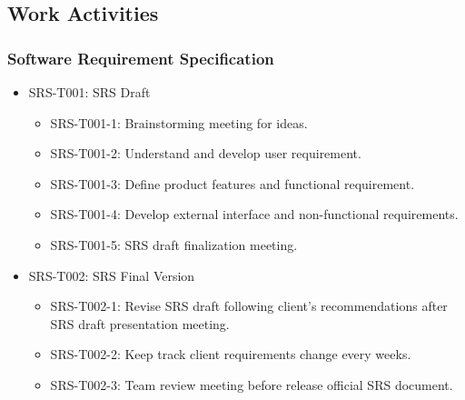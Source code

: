 \subsection{Work Activities}
	\subsubsection{Software Requirement Specification}
	\begin{itemize}
		\item SRS-T001: SRS Draft
		\begin{itemize}
			\item SRS-T001-1: Brainstorming meeting for ideas.
			\item SRS-T001-2: Understand and develop user requirement.
			\item SRS-T001-3: Define product features and functional requirement.
			\item SRS-T001-4: Develop external interface and non-functional requirements.
			\item SRS-T001-5: SRS draft finalization meeting.
		\end{itemize}
		\item SRS-T002: SRS Final Version
		\begin{itemize}
			\item  SRS-T002-1: Revise SRS draft following client's recommendations after SRS draft presentation meeting.
			\item  SRS-T002-2: Keep track client requirements change every weeks.
			\item  SRS-T002-3: Team review meeting before release official SRS document.
		\end{itemize}
	\end{itemize}

